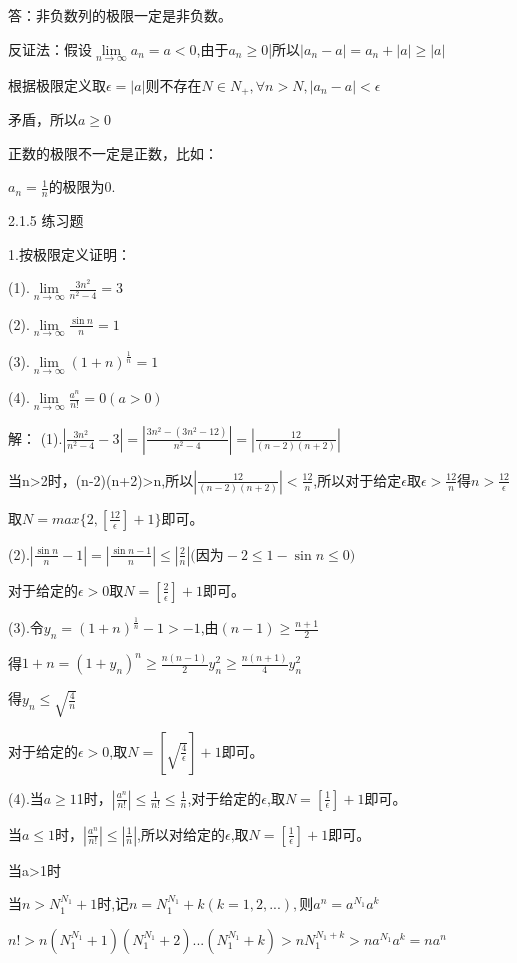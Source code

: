 \documentclass[12pt]{ctexart}
\begin{document}
答：非负数列的极限一定是非负数。

反证法：假设$\lim\limits_{n\to\infty}a_n=a<0$,由于$a_n\ge$0|所以$|a_n-a|=a_n+|a|\ge|a|$

根据极限定义取$\epsilon=|a|$则不存在$N\in{N_+},\forall{n}>N,|a_n-a|<\epsilon$

矛盾，所以$a\ge0$

正数的极限不一定是正数，比如：

$a_n=\frac{1}{n}$的极限为0.

2.1.5 练习题

1.按极限定义证明：

(1).$\lim\limits_{n\to\infty}\frac{3n^2}{n^2-4}=3$

(2).$\lim\limits_{n\to\infty}\frac{\sin{n}}{n}=1$

(3).$\lim\limits_{n\to\infty}{(1+n)^{\frac{1}{n}}}=1$

(4).$\lim\limits_{n\to\infty}\frac{a^n}{n!}=0(a>0)$

解：
(1).$|\frac{3n^2}{n^2-4}-3|=|\frac{3n^2-(3n^2-12)}{n^2-4}|=|\frac{12}{(n-2)(n+2)}|$

当n>2时，(n-2)(n+2)>n,所以$|\frac{12}{(n-2)(n+2)}|<\frac{12}{n}$,所以对于给定$\epsilon$取$\epsilon>\frac{12}{n}\textrm{得}n>\frac{12}{\epsilon}$

取$N=max\{2,[\frac{12}{\epsilon}]+1\}$即可。

(2).$|\frac{\sin{n}}{n}-1|=|\frac{\sin{n}-1}{n}|\le|\frac{2}{n}|\textrm{(因为}-2\le{1-\sin{n}}\le0)$

对于给定的$\epsilon>0$取$N=[\frac{2}{\epsilon}]+1$即可。

(3).令$y_n={(1+n)^{\frac{1}{n}}}-1>-1$,由$(n-1)\ge\frac{n+1}{2}$

得$1+n={(1+y_n)}^n\ge\frac{n(n-1)}{2}y_n^2\ge\frac{n(n+1)}{4}y_n^2$

得$y_n\le\sqrt{\frac{4}{n}}$

对于给定的$\epsilon>0$,取$N=[\sqrt{\frac{4}{\epsilon}}]+1$即可。

(4).当$a\ge1$1时，$|\frac{a^n}{n!}|\le\frac{1}{n!}\le\frac{1}{n}$,对于给定的$\epsilon$,取$N=[\frac{1}{\epsilon}]+1$即可。

当$a\le1$时，$|\frac{a^n}{n!}|\le|\frac{1}{n}|$,所以对给定的$\epsilon$,取$N=[\frac{1}{\epsilon}]+1$即可。



当a>1时

当$n>N_1^{N_1}+1$时,记$n=N_1^{N_1}+k(k=1,2,...),\textrm{则}a^n=a^{N_1}a^k$

$n!>n(N_1^{N_1}+1)(N_1^{N_1}+2)...(N_1^{N_1}+k)>nN_1^{N_1+k}>na^{N_1}a^k=na^n$
\end{document}
